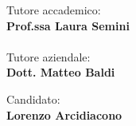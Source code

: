 \begin{titlepage}
\begin{minipage}[t]{0.47\textwidth}
	{\large{Tutore accademico:}{\normalsize\vspace{3mm}
	\bf\\ \large{Prof.ssa Laura Semini}}}\\
    {\\\large{Tutore aziendale:}{\normalsize\vspace{3mm}
	\bf\\ \large{Dott. Matteo Baldi}}}
\end{minipage}
\hfill
\begin{minipage}[t]{0.47\textwidth}\raggedleft
	{\large{Candidato:}{\normalsize\vspace{3mm} \bf\\ \large{Lorenzo Arcidiacono}}}
\end{minipage}

\vspace{10mm}
\hrulefill
\\

\end{titlepage}